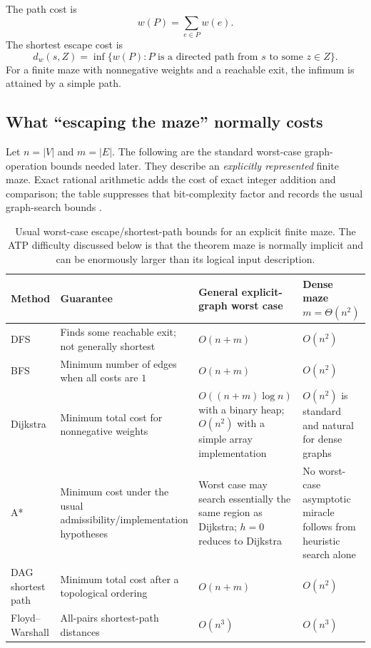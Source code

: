 The path cost is
\[
w(P)=\sum_{e\in P}w(e).
\]
The shortest escape cost is
\[
d_w(s,Z)=\inf\{w(P):P\text{ is a directed path from }s\text{ to some }z\in Z\}.
\]
For a finite maze with nonnegative weights and a reachable exit, the infimum is attained by a simple path.

\subsection{What ``escaping the maze'' normally costs}
Let $n=|V|$ and $m=|E|$. The following are the standard worst-case graph-operation bounds needed later. They describe an \emph{explicitly represented} finite maze. Exact rational arithmetic adds the cost of exact integer addition and comparison; the table suppresses that bit-complexity factor and records the usual graph-search bounds \cite{clrs,dijkstra,astar,floyd}.

\begin{table}[ht]
\centering
\small
\begin{tabularx}{\textwidth}{>{\raggedright\arraybackslash}p{2.2cm}>{\raggedright\arraybackslash}X>{\raggedright\arraybackslash}p{3.0cm}>{\raggedright\arraybackslash}p{2.5cm}}
\toprule
Method & Guarantee & General explicit-graph worst case & Dense maze $m=\Theta(n^2)$\\
\midrule
DFS & Finds some reachable exit; not generally shortest & $O(n+m)$ & $O(n^2)$\\
BFS & Minimum number of edges when all costs are $1$ & $O(n+m)$ & $O(n^2)$\\
Dijkstra & Minimum total cost for nonnegative weights & $O((n+m)\log n)$ with a binary heap; $O(n^2)$ with a simple array implementation & $O(n^2)$ is standard and natural for dense graphs\\
A* & Minimum cost under the usual admissibility/implementation hypotheses & Worst case may search essentially the same region as Dijkstra; $h=0$ reduces to Dijkstra & No worst-case asymptotic miracle follows from heuristic search alone\\
DAG shortest path & Minimum total cost after a topological ordering & $O(n+m)$ & $O(n^2)$\\
Floyd--Warshall & All-pairs shortest-path distances & $O(n^3)$ & $O(n^3)$\\
\bottomrule
\end{tabularx}
\caption{Usual worst-case escape/shortest-path bounds for an explicit finite maze. The ATP difficulty discussed below is that the theorem maze is normally implicit and can be enormously larger than its logical input description.}
\end{table}

